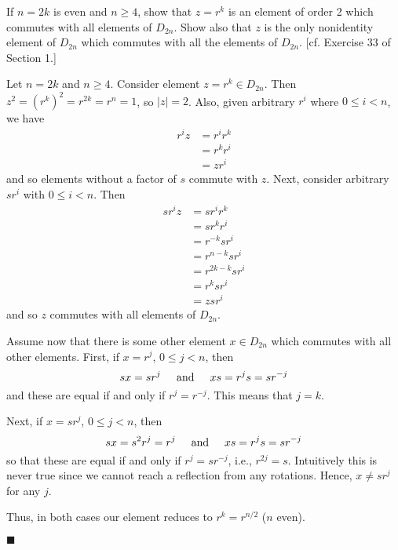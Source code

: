 \documentclass[12pt]{article}
\renewcommand{\qed}{\hfill$\blacksquare$}
\renewenvironment{proof}{\begin{addmargin}[1em]{0em}\begin{newproof}}{\end{newproof}\end{addmargin}\qed}
\newenvironment{problem}[2][Exercise]{\begin{trivlist}
\item[\hskip \labelsep {\bfseries #1}\hskip \labelsep {\bfseries #2.}]}{\end{trivlist}}
\begin{document}
\begin{problem}{1.2.4}
If $n=2k$ is even and $n\geq 4$, show that $z=r^k$ is an element of order 2 which commutes with all elements of $D_{2n}$. Show also that $z$ is the only nonidentity element of $D_{2n}$ which commutes with all the elements of $D_{2n}$. [cf. Exercise 33 of Section 1.]
\end{problem}
\begin{proof}
Let $n=2k$ and $n\geq 4$. Consider element $z=r^k\in D_{2n}$. Then $z^2=\left(r^k\right)^2=r^{2k}=r^n=1$, so $\left|z\right|=2$. Also, given arbitrary $r^i$ where $0\leq i<n$, we have
\begin{equation*}
  \begin{split}
    r^iz & = r^i r^k \\
    & = r^{k}r^{i} \\
    & = z r^i
  \end{split}
\end{equation*}
and so elements without a factor of $s$ commute with $z$. Next, consider arbitrary $sr^i$ with $0\leq i < n$. Then
\begin{equation*}
  \begin{split}
    sr^iz & = sr^i r^k \\
    & = sr^{k}r^{i} \\
    & = r^{-k}sr^i \\
    & = r^{n-k}sr^i \\
    & = r^{2k-k}sr^i \\
    & = r^k sr^i \\
    & = z sr^i
  \end{split}
\end{equation*}
and so $z$ commutes with all elements of $D_{2n}$.

Assume now that there is some other element $x\in D_{2n}$ which commutes with all other elements. First, if $x=r^j$, $0\leq j < n$, then
$$ sx = sr^j \hspace{5mm} \text{and} \hspace{5mm} xs=r^js = sr^{-j} $$ and these are equal if and only if $r^j = r^{-j}$. This means that $j=k$.

Next, if $x=sr^j$, $0 \leq j < n$, then
$$ sx = s^2 r^j = r^j \hspace{5mm} \text{and} \hspace{5mm} xs = r^js = sr^{-j} $$
so that these are equal if and only if $r^j = sr^{-j}$, i.e., $r^{2j} = s$. Intuitively this is never true since we cannot reach a reflection from any rotations. Hence, $x\neq sr^j$ for any $j$.

Thus, in both cases our element reduces to $r^k=r^{n/2}$ ($n$ even).
\end{proof}
\end{document}
